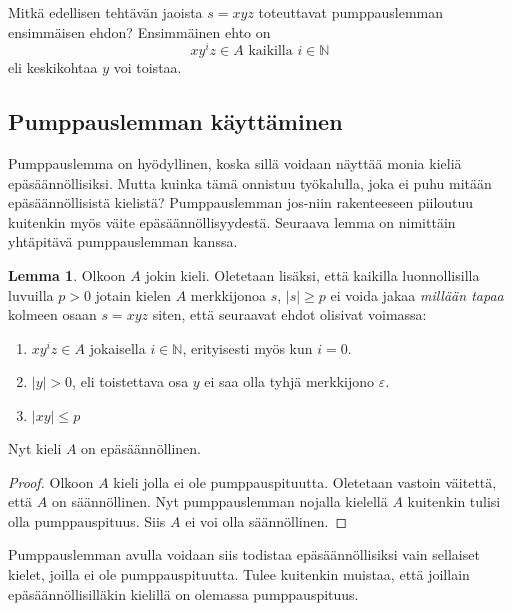 \documentclass[a4paper,11pt]{article}
\theoremstyle{definition}
\newtheorem*{lemma}{Lemma}
\newcommand{\Nat}{\mathbb{N}}
\begin{document}
\vspace{5mm}

\begin{exercise}
    Mitkä edellisen tehtävän jaoista $s = xyz$ toteuttavat pumppauslemman
    ensimmäisen ehdon? Ensimmäinen ehto on
    \begin{equation*}
        xy^iz \in A \text{ kaikilla } i \in \Nat
    \end{equation*}
    eli keskikohtaa $y$ voi toistaa.
\end{exercise}

\subsection*{Pumppauslemman käyttäminen}

Pumppauslemma on hyödyllinen, koska sillä voidaan näyttää monia kieliä
epäsäännöllisiksi. Mutta kuinka tämä onnistuu työkalulla, joka ei puhu
mitään epäsäännöllisistä kielistä? Pumppauslemman jos-niin
rakenteeseen piiloutuu kuitenkin myös väite epäsäännöllisyydestä.
Seuraava lemma on nimittäin yhtäpitävä pumppauslemman kanssa.

\begin{lemma}
  Olkoon $A$ jokin kieli. Oletetaan lisäksi, että kaikilla
  luonnollisilla luvuilla $p > 0$ jotain kielen $A$ merkkijonoa $s$,
  $|s| \ge p$ ei voida jakaa \emph{millään tapaa} kolmeen osaan $s =
  xyz$ siten, että seuraavat ehdot olisivat voimassa:
  \begin{enumerate}
  \item
    $xy^iz \in A$ jokaisella $i \in \Nat$, erityisesti myös kun $i =
    0$.
  \item
    $|y| > 0$, eli toistettava osa $y$ ei saa olla tyhjä merkkijono
    $\varepsilon$.
  \item
    $|xy| \leq p$
  \end{enumerate}
  Nyt kieli $A$ on epäsäännöllinen.
\end{lemma}
\begin{proof}
  Olkoon $A$ kieli jolla ei ole pumppauspituutta. Oletetaan vastoin
  väitettä, että $A$ on säännöllinen. Nyt pumppauslemman nojalla
  kielellä $A$ kuitenkin tulisi olla pumppauspituus. Siis $A$ ei voi
  olla säännöllinen.
\end{proof}

Pumppauslemman avulla voidaan siis todistaa epäsäännöllisiksi vain
sellaiset kielet, joilla ei ole pumppauspituutta. Tulee kuitenkin
muistaa, että joillain epäsäännöllisilläkin kielillä on olemassa
pumppauspituus.
\end{document}
